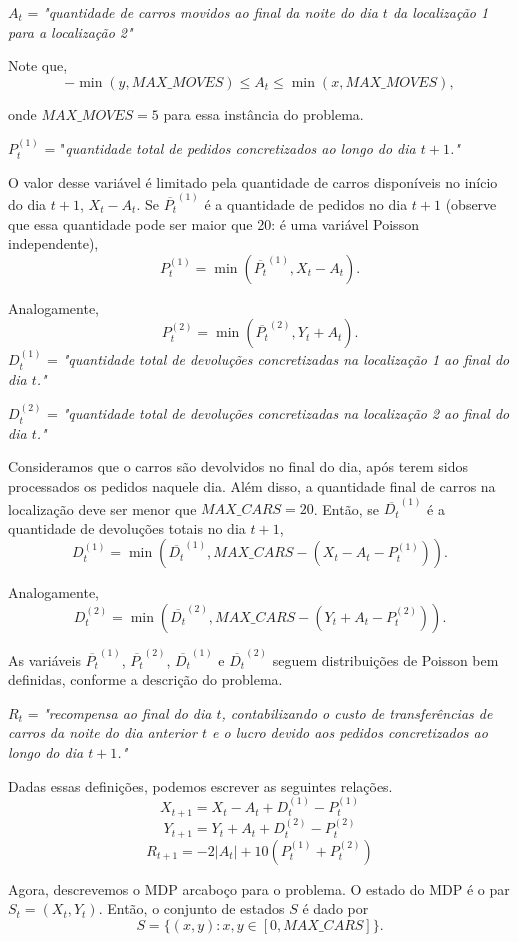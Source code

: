 \documentclass{article}
\begin{document}
$A_t$ = \textit{"quantidade de carros movidos ao final da noite do dia $t$ da localização 1 para a localização 2"}

Note que,
\[
-\min(y,MAX\_MOVES) \le A_t \le \min(x,MAX\_MOVES)
,\] 

onde $MAX\_MOVES = 5$ para essa instância do problema.


$P_t^{(1)}$ = "\textit{quantidade total de pedidos concretizados ao longo do dia $t+1$."}

O valor desse variável é limitado pela quantidade de carros disponíveis no início do dia $t+1$, $X_t-A_t$. Se  $\overline{P_t}^{(1)}$ é a quantidade de pedidos no dia $t+1$ (observe que essa quantidade pode ser maior que 20: é uma variável Poisson independente),
\[
P_t^{(1)} = \min(\overline{P_t}^{(1)}, X_t-A_t)
.\] 

Analogamente,
\[
P_t^{(2)} = \min(\overline{P_t}^{(2)}, Y_t+A_t)
.\] 
  $D_t^{(1)}$ = \textit{"quantidade total de devoluções concretizadas na localização 1 ao final do dia $t$."}

  $D_t^{(2)}$ = \textit{"quantidade total de devoluções concretizadas na localização 2 ao final do dia $t$."}

  Consideramos que o carros são devolvidos no final do dia, após terem sidos processados os pedidos naquele dia. Além disso, a quantidade final de carros na localização deve ser menor que $MAX\_CARS=20$. Então, se $\overline{D_t}^{(1)}$ é a quantidade de devoluções totais no dia $t+1$,
  \[
    D_t^{(1)} = \min(\overline{D_t}^{(1)},MAX\_CARS-(X_t-A_t-P_t^{(1)}))  
  .\] 

Analogamente,
\[
    D_t^{(2)} = \min(\overline{D_t}^{(2)},MAX\_CARS-(Y_t+A_t-P_t^{(2)}))  
.\] 

As variáveis $\overline{P_t}^{(1)}$, $\overline{P_t}^{(2)}$, $\overline{D_t}^{(1)}$ e $\overline{D_t}^{(2)}$ seguem distribuições de Poisson bem definidas, conforme a descrição do problema.

$R_t$ = \textit{"recompensa ao final do dia $t$, contabilizando o custo de transferências de carros da noite do dia anterior $t$ e o lucro devido aos pedidos concretizados ao longo do dia $t+1$."}

Dadas essas definições, podemos escrever as seguintes relações.
\[
  X_{t+1} = X_t - A_t + D_t^{(1)} - P_t^{(1)}
\] 
\[
  Y_{t+1} = Y_t + A_t + D_t^{(2)} - P_t^{(2)}
\] 
\[
  R_{t+1} = -2|A_t| + 10(P_t^{(1)} + P_t^{(2)})
\] 

Agora, descrevemos o MDP arcaboço para o problema. O estado do MDP é o par $S_t = (X_t,Y_t)$. Então, o conjunto de estados $S$ é dado por
\[
  S = \{(x,y) : x,y \in [0,MAX\_CARS]\}
.\] 
\end{document}

